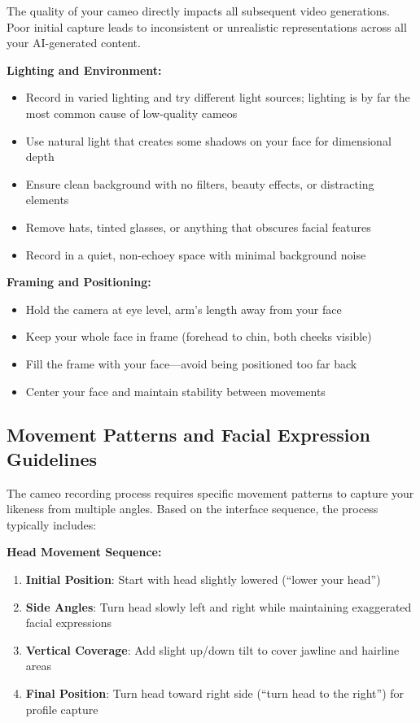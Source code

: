 The quality of your cameo directly impacts all subsequent video generations. Poor initial capture leads to inconsistent or unrealistic representations across all your AI-generated content.

\textbf{Lighting and Environment:}
\begin{itemize}
\item Record in varied lighting and try different light sources; lighting is by far the most common cause of low-quality cameos
\item Use natural light that creates some shadows on your face for dimensional depth
\item Ensure clean background with no filters, beauty effects, or distracting elements
\item Remove hats, tinted glasses, or anything that obscures facial features
\item Record in a quiet, non-echoey space with minimal background noise \citep{openai2024cameos}
\end{itemize}

\textbf{Framing and Positioning:}
\begin{itemize}
\item Hold the camera at eye level, arm's length away from your face
\item Keep your whole face in frame (forehead to chin, both cheeks visible)
\item Fill the frame with your face—avoid being positioned too far back
\item Center your face and maintain stability between movements
\end{itemize}

\subsection{Movement Patterns and Facial Expression Guidelines}

The cameo recording process requires specific movement patterns to capture your likeness from multiple angles. Based on the interface sequence, the process typically includes:

\textbf{Head Movement Sequence:}
\begin{enumerate}
\item \textbf{Initial Position}: Start with head slightly lowered (``lower your head'')
\item \textbf{Side Angles}: Turn head slowly left and right while maintaining exaggerated facial expressions
\item \textbf{Vertical Coverage}: Add slight up/down tilt to cover jawline and hairline areas
\item \textbf{Final Position}: Turn head toward right side (``turn head to the right'') for profile capture
\end{enumerate}

